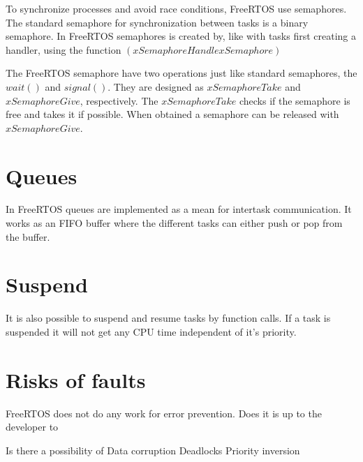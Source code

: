 To synchronize processes and avoid race conditions, FreeRTOS use semaphores. The standard semaphore for synchronization between tasks is a binary semaphore. In FreeRTOS semaphores is created by, like with tasks first creating a handler, using the function $( xSemaphoreHandle xSemaphore )$

The FreeRTOS semaphore have two operations just like standard semaphores, the $wait()$ and $signal()$. They are designed as $xSemaphoreTake$ and $xSemaphoreGive$, respectively. The $xSemaphoreTake$ checks if the semaphore is free and takes it if possible.
When obtained a semaphore can be released with $xSemaphoreGive$.

\section{ Queues }

In FreeRTOS queues are implemented as a mean for intertask communication. It works as an FIFO buffer where the different tasks can either push or pop from the buffer.

\section{ Suspend }
It is also possible to suspend and resume tasks by function calls. If a task is suspended it will not get any CPU time independent of it's priority.

\section{Risks of faults}

FreeRTOS does not do any work for error prevention. Does it is up to the developer to 

Is there a possibility of 
Data corruption
Deadlocks
Priority inversion